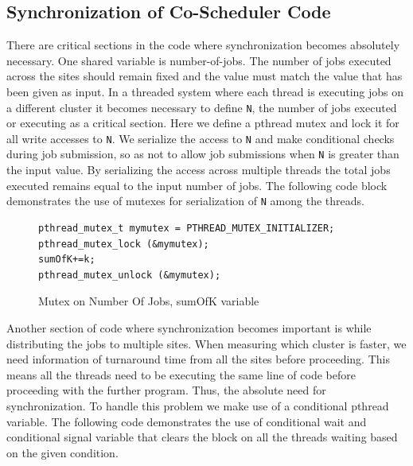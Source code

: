 \documentclass[ms,electronic,double]{nuthesis}
\begin{document}
\subsection{Synchronization of  Co-Scheduler Code}

There are critical sections in the code where synchronization becomes absolutely 
necessary. One shared variable is number-of-jobs. The number of jobs executed across 
the sites should remain fixed and the value must match the value that has been 
given as input. In a threaded system where each thread is executing jobs on a 
different cluster it becomes necessary to define \texttt{N}, the number of jobs executed or executing as a 
critical section. Here we define a pthread mutex and lock it for all write accesses to 
\texttt{N}. We serialize the access to \texttt{N} and make conditional checks during job submission, so as not to allow
job submissions when \texttt{N} is greater than the input value. By 
serializing the access across multiple threads the total jobs executed remains 
equal to the input number of jobs. The following code block 
demonstrates the use of mutexes for serialization of  \texttt{N} among the threads.

\begin{figure}[htbp!]

\begin{lstlisting}
pthread_mutex_t mymutex = PTHREAD_MUTEX_INITIALIZER;
pthread_mutex_lock (&mymutex);
sumOfK+=k;
pthread_mutex_unlock (&mymutex);
\end{lstlisting}

\caption{Mutex on Number Of Jobs, sumOfK variable}
\label{fig:mutex}

\end{figure}


Another section of code where synchronization becomes important is while 
distributing the jobs to multiple sites. When measuring which cluster is 
faster, we need information of turnaround time from all the sites 
before proceeding. This means all the threads need to be executing the same line of code 
before proceeding with the further program. Thus, the absolute need for 
synchronization. To handle this problem we make use of a conditional pthread variable. The following code demonstrates the use of conditional wait 
and conditional signal variable that clears the block on all the threads waiting 
based on the given condition.
\end{document}
